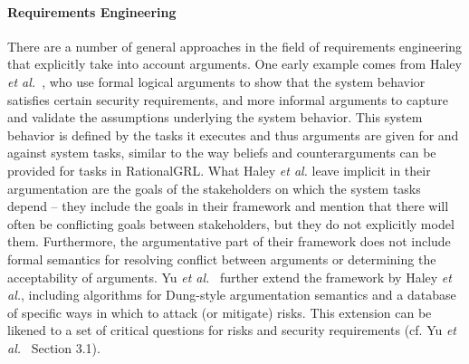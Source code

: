 \paragraph{Requirements Engineering} There are a number of general approaches in the field of requirements engineering that explicitly take into account arguments. One early example comes from Haley \emph{et al.}~\cite{haley2008security}, who use formal logical arguments to show that the system behavior satisfies certain security requirements, and more informal arguments to capture and validate the assumptions underlying the system behavior. This system behavior is defined by the tasks it executes and thus arguments are given for and against system tasks, similar to the way beliefs and counterarguments can be provided for tasks in RationalGRL. What Haley \emph{et al.} leave implicit in their argumentation are the goals of the stakeholders on which the system tasks depend -- they include the goals in their framework and mention that there will often be conflicting goals between stakeholders, but they do not explicitly model them. Furthermore, the argumentative part of their framework does not include formal semantics for resolving conflict between arguments or determining the acceptability of arguments. Yu \emph{et al.}~\cite{yu2015automated} further extend the framework by Haley \emph{et al.}, including algorithms for Dung-style argumentation semantics \cite{Dung1995} and a database of specific ways in which to attack (or mitigate) risks. This extension can be likened to a set of critical questions for risks and security requirements (cf. Yu \emph{et al.}~\cite{yu2015automated} Section 3.1). 

